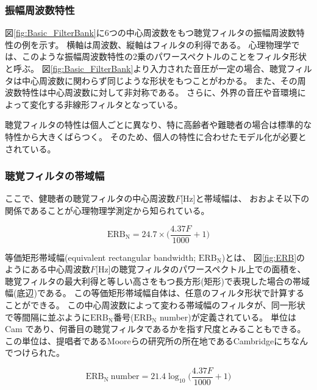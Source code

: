 \subsubsection{振幅周波数特性}
図\ref{fig:Basic_FilterBank}に6つの中心周波数をもつ聴覚フィルタの振幅周波数特性の例を示す。
横軸は周波数、縦軸はフィルタの利得である。
心理物理学では、このような振幅周波数特性の2乗のパワースペクトルのことをフィルタ形状と呼ぶ。
図\ref{fig:Basic_FilterBank}より入力された音圧が一定の場合、聴覚フィルタは中心周波数に関わらず同じような形状をもつことがわかる。
また、その周波数特性は中心周波数に対して非対称である。
さらに、外界の音圧や音環境によって変化する非線形フィルタとなっている。

聴覚フィルタの特性は個人ごとに異なり、特に高齢者や難聴者の場合は標準的な特性から大きくばらつく。
そのため、個人の特性に合わせたモデル化が必要とされている。

\subsubsection{聴覚フィルタの帯域幅}
ここで、健聴者の聴覚フィルタの中心周波数$F$[Hz]と帯域幅は、
おおよそ以下の関係であることが心理物理学測定から知られている\cite{moore2013introduction}。

\begin{equation}
	\mathrm{ERB_N} = 24.7 \times\bigl(\frac{4.37F}{1000} + 1\bigr)
    \label{eq:ERB}
\end{equation}

等価矩形帯域幅(equivalent rectangular bandwidth; $\mathrm{ERB_N}$)とは、
図\ref{fig:ERB}のようにある中心周波数$F$[Hz]の聴覚フィルタのパワースペクトル上での面積を、
聴覚フィルタの最大利得と等しい高さをもつ長方形(矩形)で表現した場合の帯域幅(底辺)である。
この等価矩形帯域幅自体は、任意のフィルタ形状で計算することができる。
この中心周波数によって変わる帯域幅のフィルタが、同一形状で等間隔に並ぶように$\mathrm{ERB_N}$番号($\mathrm{ERB_N}$ number)が定義されている。%
単位はCam であり、何番目の聴覚フィルタであるかを指す尺度とみることもできる\cite{unoki2021Method}。
この単位は、提唱者であるMooreらの研究所の所在地であるCambridgeにちなんでつけられた\cite{hartmann2004Signal}。 


\begin{equation}
    \mathrm{ERB_N \ number} = 21.4 \log_{10} \bigl(\frac{4.37F}{1000} + 1\bigr)
\end{equation}

